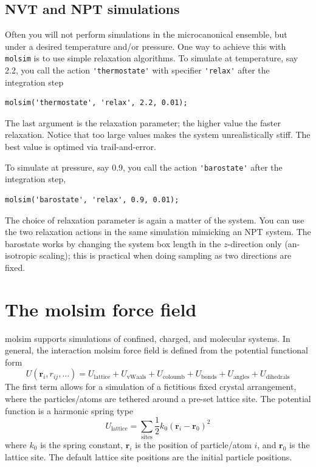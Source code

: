 \documentclass[11pt]{article}
\begin{document}
\subsection{NVT and NPT simulations}
Often you will not perform simulations in the microcanonical ensemble, but under
a desired temperature and/or pressure. One way to achieve this with
\verb!molsim! is to use simple relaxation algorithms. To simulate at
temperature, say 2.2, you call the action \verb!'thermostate'! with specifier
\verb!'relax'! after the integration step
\begin{verbatim}
molsim('thermostate', 'relax', 2.2, 0.01);
\end{verbatim}
The last argument is the relaxation parameter; the higher value the faster
relaxation. Notice that too large values makes the system unrealistically
stiff. The best value is optimed via trail-and-error.

To simulate at pressure, say 0.9, you call the action \verb!'barostate'! after
the integration step,
\begin{verbatim}
molsim('barostate', 'relax', 0.9, 0.01);
\end{verbatim}
The choice of relaxation parameter is again a matter of the system. You can use
the two relaxation actions in the same simulation mimicking an NPT system. The
barostate works by changing the system box length in the $z$-direction only
(an-isotropic scaling); this is practical when doing sampling as two directions
are fixed.

\section{The \textsf{molsim} force field}
\textsf{molsim} supports simulations of confined, charged, and molecular
systems. In general, the interaction \textsf{molsim} force field is defined from
the potential functional form
\begin{equation}
  U(\mathbf{r}_i, r_{ij}, \ldots)
  =  U_\mathrm{lattice} + U_\mathrm{vWaals} + U_{\mathrm{coloumb}} +
  U_\mathrm{bonds} + U_\mathrm{angles} + 
  U_\mathrm{dihedrals}
\end{equation}
The first term allows for a simulation of a fictitious fixed crystal
arrangement, where the particles/atoms are tethered around a pre-set lattice
site. The potential function is a harmonic spring type
\begin{equation}
  U_\mathrm{lattice} =
  \sum_\mathrm{sites} \frac{1}{2}k_0 (\mathbf{r}_i - \mathbf{r}_0)^2
\end{equation}
where $k_0$ is the spring constant, $\mathbf{r}_i$ is the position of
particle/atom $i$, and $\mathbf{r}_0$ is the lattice site. The default
lattice site positions are the initial particle positions.
\end{document}
